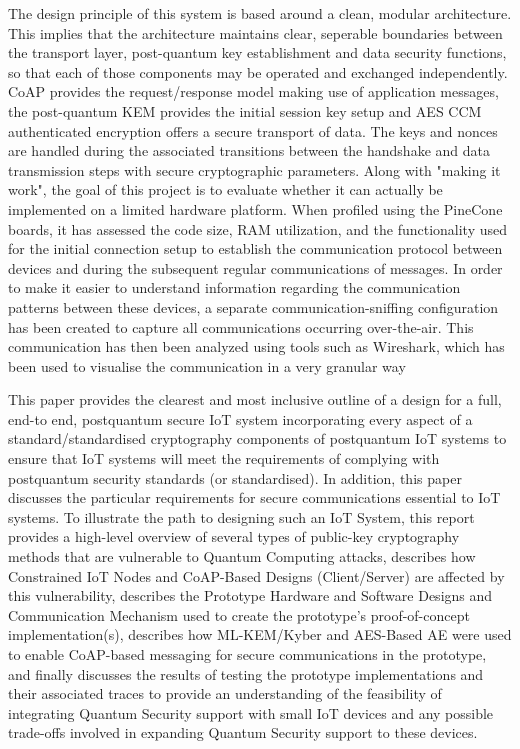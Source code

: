 \documentclass[a4paper]{scrartcl}
\begin{document}
    The design principle of this system is based around a clean, modular architecture. This implies that the architecture maintains clear, seperable boundaries between the transport layer, post-quantum key establishment and data security functions, so that each of those components may be operated and exchanged independently. CoAP provides the request/response model making use of application messages, the post-quantum KEM provides the initial session key setup and AES CCM authenticated encryption offers a secure transport of data. The keys and nonces are handled during the associated transitions between the handshake and data transmission steps with secure cryptographic parameters. Along with "making it work", the goal of this project is to evaluate whether it can actually be implemented on a limited hardware platform. When profiled using the PineCone boards, it has assessed the code size, RAM utilization, and the functionality used for the initial connection setup to establish the communication protocol between devices and during the subsequent regular communications of messages. In order to make it easier to understand information regarding the communication patterns between these devices, a separate communication-sniffing configuration has been created to capture all communications occurring over-the-air. This communication has then been analyzed using tools such as Wireshark, which has been used to visualise the communication in a very granular way
    
    This paper provides the clearest and most inclusive outline of a design for a full, end-to end, postquantum secure IoT system incorporating every aspect of a standard/standardised cryptography components of postquantum IoT systems to ensure that IoT systems will meet the requirements of complying with postquantum security standards (or standardised). In addition, this paper discusses the particular requirements for secure communications essential to IoT systems. To illustrate the path to designing such an IoT System, this report provides a high-level overview of several types of public-key cryptography methods that are vulnerable to Quantum Computing attacks, describes how Constrained IoT Nodes and CoAP-Based Designs (Client/Server) are affected by this vulnerability, describes the Prototype Hardware and Software Designs and Communication Mechanism used to create the prototype's proof-of-concept implementation(s), describes how ML-KEM/Kyber and AES-Based AE were used to enable CoAP-based messaging for secure communications in the prototype, and finally discusses the results of testing the prototype implementations and their associated traces to provide an understanding of the feasibility of integrating Quantum Security support with small IoT devices and any possible trade-offs involved in expanding Quantum Security support to these devices.
\end{document}
